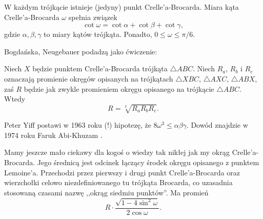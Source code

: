 \begin{proposition}
    W każdym trójkącie istnieje (jedyny) punkt Crelle'a-Brocarda.
    Miara kąta Crelle'a-Brocarda $\omega$ spełnia związek
    \begin{equation}
        \cot \omega = \cot \alpha + \cot \beta + \cot \gamma,
    \end{equation}
    gdzie $\alpha, \beta, \gamma$ to miary kątów trójkąta.
    Ponadto, $0 \le \omega \le \pi/6$.
\end{proposition}

Bogdańska, Neugebauer \cite[s. 100]{neugebauer_2018} podadzą jako ćwiczenie:

\begin{proposition}
    Niech $X$ będzie punktem Crelle'a-Brocarda trójkąta $\triangle ABC$.
    Niech $R_a$, $R_b$ i $R_c$ oznaczają promienie okręgów opisanych na trójkątach $\triangle XBC$, $\triangle AXC$, $\triangle ABX$, zaś $R$ będzie jak zwykle promieniem okręgu opisanego na trójkącie $\triangle ABC$.
    Wtedy
    \begin{equation}
        R = \sqrt[3]{R_a R_b R_c}.
    \end{equation}
\end{proposition}

Peter Yiff \cite{yff_1963} postawi w 1963 roku (!) hipotezę, że $8 \omega^3 \le \alpha \beta \gamma$.
%
Dowód znajdzie w 1974 roku Faruk Abi-Khuzam \cite{abikhuzam_1974}.
%

Mamy jeszcze mało ciekawy dla kogoś o wiedzy tak nikłej jak my okrąg Crelle'a-Brocarda.
%
Jego średnicą jest odcinek łączący środek okręgu opisanego z punktem Lemoine'a.
%
%
Przechodzi przez pierwszy i drugi punkt Crelle'a-Brocarda oraz wierzchołki celowo niezdefiniowanego tu trójkąta Brocarda, co uzasadnia stosowaną czasami nazwę ,,okrąg siedmiu punktów''.
%
Ma promień
\begin{equation}
    R \cdot \frac{\sqrt{1 - 4 \sin^2 \omega}}{2 \cos \omega}.
\end{equation}

%